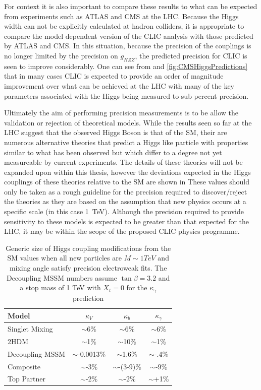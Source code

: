 For context it is also important to compare these results to what can be expected from experiments such as ATLAS and CMS at the LHC. Because the Higgs width can not be explicitly calculated at hadron colliders, it is appropriate to compare the model dependent version of the CLIC analysis with those predicted by ATLAS and CMS. In this situation, because the precision of the couplings is no longer limited by the precision on $g_{HZZ}$, the predicted precision for CLIC is seen to improve considerably. One can see from  and \ref{fig:CMSHiggsPredictions} that in many cases CLIC is expected to provide an order of magnitude improvement over what can be achieved at the LHC with many of the key parameters associated with the Higgs being measured to sub percent precision.

Ultimately the aim of performing precision measurements is to be allow the validation or rejection of theoretical models. While the results seen so far at the LHC suggest that the observed Higgs Boson is that of the \ac{SM}, their are numerous alternative theories that predict a Higgs like particle with properties similar to what has been observed but which differ to a degree not yet measureable by current experiments. The details of these theories will not be expanded upon within this thesis, however the deviations expected in the Higgs couplings of these theories relative to the \ac{SM} are shown in  These values should only be taken as a rough guideline for the precision required to discover/reject the theories as they are based on the assumption that new physics occurs at a specific scale (in this case 1~TeV). Although the precision required to provide sensitivity to these models is expected to be greater than that expected for the LHC, it may be within the scope of the proposed CLIC physics programme.  

\begin{table}
  \centering
  \begin{tabular}{l c c c}
    \toprule
    \toprule
    Model  & $\kappa_V$ & $\kappa_b$ & $\kappa_\gamma$  \\
    \midrule
    Singlet Mixing & $\sim$6\% & $\sim$6\%  & $\sim$6\% \\
    2HDM & $\sim$1\% & $\sim$10\%  & $\sim$1\% \\
    Decoupling MSSM & $\sim$-0.0013\% & $\sim$1.6\%  & $\sim$-.4\% \\
    Composite & $\sim$-3\% & $\sim$-(3-9)\%  & $\sim$-9\% \\
    Top Partner & $\sim$-2\% & $\sim$-2\%  & $\sim$+1\% \\
    \bottomrule
    \bottomrule
  \end{tabular}
  \caption[Predicted Higgs Coupling Modifications for BSM theories]{Generic size of Higgs coupling modifications from the \ac{SM} values when all new particles are $M\sim 1 TeV$ and mixing angle satisfy precision electroweak fits. The Decoupling MSSM numbers assume $\tan\beta = 3.2$ and a stop mass of 1 TeV with $X_t =0$ for the $\kappa_\gamma$ prediction \cite{Dawson:2013bba}}
  \label{table:snowmass}
\end{table}

